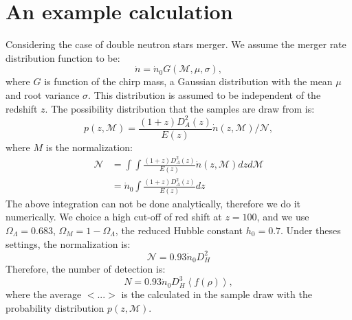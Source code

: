 \documentclass{article}
\begin{document}
\section{An example calculation}
Considering the case of double neutron stars merger. We assume the merger rate distribution function to be:
\begin{equation}
    \dot{n}=\dot{n}_0G(\mathcal{M},\mu,\sigma),
\end{equation}
where $G$ is function of the chirp mass, a Gaussian distribution with the mean $\mu$ and root variance $\sigma$. This distribution is assumed to be independent of the redshift $z$. The possibility distribution that the samples are draw from is:
\begin{equation}
    p(z,\mathcal{M})=\frac{(1+z)D^2_A(z)}{E(z)}\dot{n}(z,\mathcal{M})/\mathcal{N}, 
\end{equation}
where $M$ is the normalization: 
\begin{align}
    \mathcal{N}&=\int\int\frac{(1+z)D^2_A(z)}{E(z)}\dot{n}(z,\mathcal{M})dzd\mathcal{M}\\\nonumber
               &=\dot{n}_0\int\frac{(1+z)D^2_A(z)}{E(z)}dz
\end{align}
The above integration can not be done analytically, therefore we do it numerically.  We choice a high cut-off of red shift at $z=100$, and we use $\Omega_\Lambda=0.683$, $\Omega_M=1-\Omega_\Lambda$, the reduced Hubble constant $h_0=0.7$. Under theses settings, the normalization is:
\begin{equation}
    \mathcal{N}=0.93\dot{n}_0D^2_H
\end{equation}
Therefore, the number of detection is:
\begin{equation}
    N=0.93\dot{n}_0D_H^3\left<f(\rho)\right>,
\end{equation}
where the average $<...>$ is the calculated in the sample draw with the probability distribution $p(z,\mathcal{M})$. 
\end{document}
